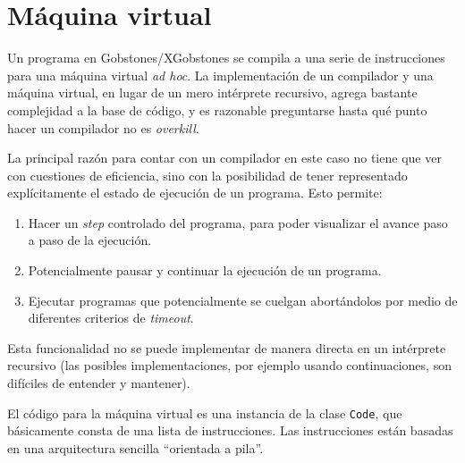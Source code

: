 \documentclass{article}
\begin{document}
\section{M\'aquina virtual}

Un programa en Gobstones/XGobstones se compila a una serie de instrucciones para una m\'aquina
virtual {\em ad hoc}. La implementaci\'on de un compilador y una m\'aquina virtual,
en lugar de un mero int\'erprete recursivo, agrega bastante complejidad a la base de c\'odigo,
y es razonable preguntarse hasta qu\'e punto hacer un compilador no es {\em overkill}.

La principal raz\'on para contar con un compilador en este caso no tiene que ver con cuestiones de
eficiencia, sino con la posibilidad de tener representado expl\'icitamente el estado de
ejecuci\'on de un programa.
Esto permite:
\begin{enumerate}
\item Hacer un {\em step} controlado del programa,
      para poder visualizar el avance paso a paso de la ejecuci\'on.
\item Potencialmente pausar y continuar la ejecuci\'on de un programa.
\item Ejecutar programas que potencialmente se cuelgan abort\'andolos por medio de diferentes
      criterios de {\em timeout}.
\end{enumerate}
Esta funcionalidad no se puede implementar de manera directa en un int\'erprete recursivo
(las posibles implementaciones, por ejemplo usando continuaciones, son
dif\'iciles de entender y mantener).

El c\'odigo para la m\'aquina virtual es una instancia de la clase \texttt{Code},
que b\'asicamente consta de una lista de instrucciones. Las instrucciones est\'an
basadas en una arquitectura sencilla ``orientada a pila''.
\end{document}
